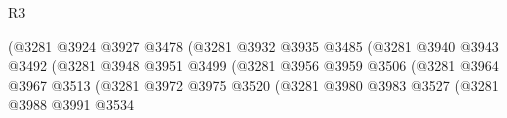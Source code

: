 \begin{lexlean}{R3}
\begin{coremodule}
                                                          (@3281
                                                            @3924
                                                            @3927
                                                            @3478
                                                            (@3281
                                                              @3932
                                                              @3935
                                                              @3485
                                                              (@3281
                                                                @3940
                                                                @3943
                                                                @3492
                                                                (@3281
                                                                  @3948
                                                                  @3951
                                                                  @3499
                                                                  (@3281
                                                                    @3956
                                                                    @3959
                                                                    @3506
                                                                    (@3281
                                                                      @3964
                                                                      @3967
                                                                      @3513
                                                                      (@3281
                                                                        @3972
                                                                        @3975
                                                                        @3520
                                                                        (@3281
                                                                          @3980
                                                                          @3983
                                                                          @3527
                                                                          (@3281
                                                                            @3988
                                                                            @3991
                                                                            @3534

\end{coremodule}
\end{lexlean}
